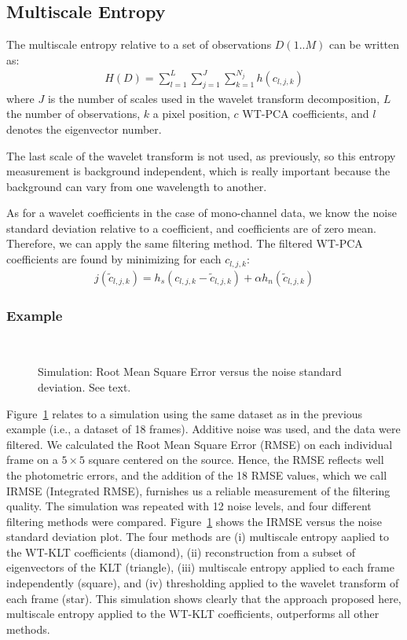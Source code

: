 \subsection{Multiscale Entropy}
The multiscale entropy relative to a set of observations $D(1..M)$ can 
be written as:
\begin{eqnarray}
H(D) = \sum_{l=1}^{L} \sum_{j=1}^{J}  \sum_{k=1}^{N_j} h(c_{l,j,k})
\end{eqnarray}
where $J$ is the number of scales used in the wavelet transform
decomposition, $L$ the number of observations, $k$ a pixel position,
 $c$ WT-PCA coefficients, and $l$ denotes the eigenvector number.

The last scale of the wavelet transform is not used, as previously, so
this entropy measurement is background independent, which is really
important because the background can vary from one wavelength to another.

As for a wavelet coefficients in the case of mono-channel data,
we know the noise standard deviation relative to a coefficient,
and coefficients are of zero mean. Therefore, we can apply the same
filtering method. The filtered WT-PCA coefficients are found by minimizing
for each  $c_{l,j,k}$:
\begin{eqnarray}
j(\tilde c_{l,j,k}) = h_s(c_{l,j,k} -\tilde c_{l,j,k}) 
                      + \alpha h_n(\tilde c_{l,j,k})
\label{eqn_func_mc}
\end{eqnarray}

\subsubsection*{Example}

\begin{figure}[htb]
\centerline{
\hbox{ 
}}
\caption{Simulation: Root Mean Square Error versus the  noise standard deviation.
See text.}
\label{fig_simu20_noi12}
\end{figure}

Figure~\ref{fig_simu20_noi12} relates to a simulation using the same dataset 
as in the previous example (i.e., 
a dataset of 18 frames).
Additive noise was used, and the data were filtered. 
We  calculated the Root Mean Square Error
(RMSE) on each individual frame on a $5 \times 
5$ square centered on the source.
Hence, the RMSE reflects well the photometric errors, and the addition
of the 18 RMSE values, which we call IRMSE (Integrated RMSE), 
furnishes us a reliable measurement of the filtering quality.
The simulation was repeated with 12 noise levels, and four
different filtering methods were compared. Figure~\ref{fig_simu20_noi12}
shows the IRMSE versus the noise standard deviation plot. The four
methods are (i) multiscale entropy aaplied to 
the WT-KLT coefficients (diamond),
(ii) reconstruction from a subset of eigenvectors of the KLT (triangle),
(iii) multiscale entropy applied to each frame independently (square),
and (iv) thresholding applied to the wavelet transform of each frame (star).
This simulation shows clearly that the approach proposed here, multiscale
entropy applied to the WT-KLT coefficients, outperforms all other methods.

